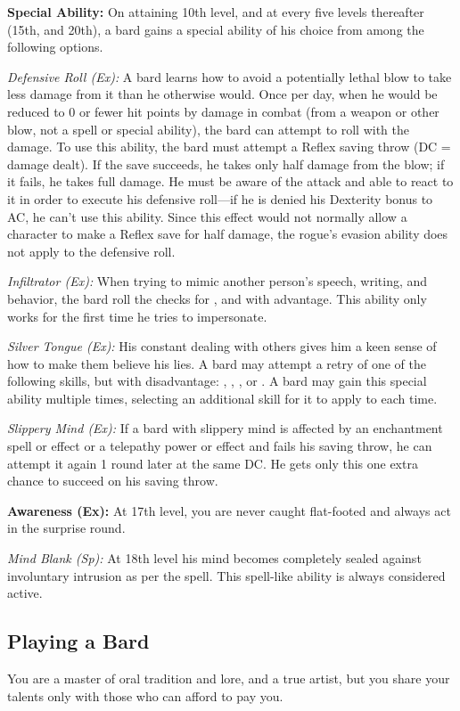 \textbf{Special Ability:} On attaining 10th level, and at every five levels thereafter (15th, and 20th), a bard gains a special ability of his choice from among the following options.

\textit{Defensive Roll (Ex):} A bard learns how to avoid a potentially lethal blow to take less damage from it than he otherwise would. Once per day, when he would be reduced to 0 or fewer hit points by damage in combat (from a weapon or other blow, not a spell or special ability), the bard can attempt to roll with the damage. To use this ability, the bard must attempt a Reflex saving throw (DC = damage dealt). If the save succeeds, he takes only half damage from the blow; if it fails, he takes full damage. He must be aware of the attack and able to react to it in order to execute his defensive roll---if he is denied his Dexterity bonus to AC, he can't use this ability. Since this effect would not normally allow a character to make a Reflex save for half damage, the rogue's evasion ability does not apply to the defensive roll.

\textit{Infiltrator (Ex):} When trying to mimic another person's speech, writing, and behavior, the bard roll the checks for ,  and  with advantage. This ability only works for the first time he tries to impersonate.

\textit{Silver Tongue (Ex):} His constant dealing with others gives him a keen sense of how to make them believe his lies. A bard may attempt a retry of one of the following skills, but with disadvantage: , , , or . A bard may gain this special ability multiple times, selecting an additional skill for it to apply to each time.

\textit{Slippery Mind (Ex):} If a bard with slippery mind is affected by an enchantment spell or effect or a telepathy power or effect and fails his saving throw, he can attempt it again 1 round later at the same DC. He gets only this one extra chance to succeed on his saving throw.

\textbf{Awareness (Ex):} At 17th level, you are never caught flat-footed and always act in the surprise round.

\textit{Mind Blank (Sp):} At 18th level his mind becomes completely sealed against involuntary intrusion as per the  spell. This spell-like ability is always considered active.


\subsection{Playing a Bard}
You are a master of oral tradition and lore, and a true artist, but you share your talents only with those who can afford to pay you.

